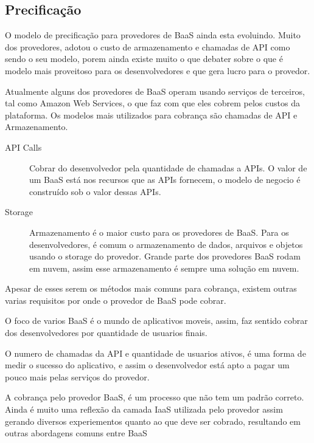 	\subsection{Precificação}
	O modelo de precificação para provedores de BaaS ainda esta evoluindo. Muito dos provedores, adotou o custo de armazenamento e chamadas de API como sendo o seu modelo, porem ainda existe muito o que debater sobre o que é modelo mais proveitoso para os desenvolvedores e que gera lucro para o provedor.

	Atualmente alguns dos provedores de BaaS operam usando serviços de terceiros, tal como Amazon Web Services, o que faz com que eles cobrem pelos custos da plataforma. Os modelos mais utilizados para cobrança são chamadas de API e Armazenamento.

	\begin{description}
		\item[]
		\item[API Calls]{ Cobrar do desenvolvedor pela quantidade de chamadas a APIs. O valor de um BaaS está nos recursos que as APIs fornecem, o modelo de negocio é construído sob o valor dessas APIs.}
		
		\item[Storage]{ Armazenamento é o maior custo para os provedores de BaaS. Para os desenvolvedores, é comum o armazenamento de dados, arquivos e objetos usando o storage do provedor. Grande parte dos provedores BaaS rodam em nuvem, assim esse armazenamento é sempre uma solução em nuvem. }
	\end{description}

	Apesar de esses serem os métodos mais comuns para cobrança, existem outras varias requisitos por onde o provedor de BaaS pode cobrar.


	O foco de varios BaaS é o mundo de aplicativos moveis, assim, faz sentido cobrar dos desenvolvedores por quantidade de usuarios finais.	

	
	O numero de chamadas da API e quantidade de usuarios ativos, é uma forma de medir o sucesso do aplicativo,  e assim o desenvolvedor está apto a pagar um pouco mais pelas serviços do provedor.

	A cobrança pelo provedor BaaS, é um processo que não tem um padrão correto. Ainda é muito uma reflexão da camada IaaS utilizada pelo provedor assim gerando diversos experiementos quanto ao que deve ser cobrado, resultando em outras abordagens comuns entre BaaS


